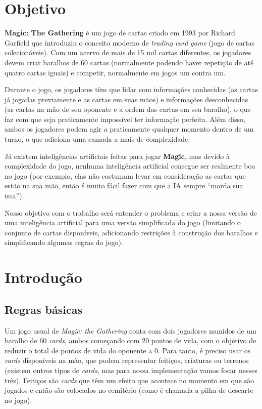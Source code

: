 \documentclass{book}
\begin{document}
\chapter*{Objetivo}
\textbf{Magic: The Gathering} é um jogo de cartas criado em 1993 por
Richard Garfield que introduziu o conceito moderno de \textit{trading
card game} (jogo de cartas colecionáveis). Com um acervo de mais de 15
mil cartas diferentes, os jogadores devem criar baralhos de 60 cartas
(normalmente podendo haver repetição de até quatro cartas iguais) e
competir, normalmente em jogos um contra um.
\par Durante o jogo, os jogadores têm que lidar com informações
conhecidas (as cartas já jogadas previamente e as cartas em suas mãos) e
informações desconhecidas (as cartas na mão de seu oponente e a ordem
das cartas em seu baralho), o que faz com que seja praticamente
impossível ter informação perfeita. Além disso, ambos os jogadores podem
agir a praticamente qualquer momento dentro de um turno, o que adiciona
uma camada a mais de complexidade.
\par Já existem inteligências artificiais feitas para jogar
\textbf{Magic}, mas devido à complexidade do jogo, nenhuma inteligência
artificial consegue ser realmente boa no jogo (por exemplo, elas não
costumam levar em consideração as cartas que estão na sua mão, então é
muito fácil fazer com que a IA sempre ``morda sua isca'').
\par Nosso objetivo com o trabalho será entender o problema e criar a
nossa versão de uma inteligência artificial para uma versão simplificada
do jogo (limitando o conjunto de cartas disponíveis, adicionando
restrições à construção dos baralhos e simplificando algumas regras do
jogo).

\chapter{Introdução}

\section{Regras básicas}

Um jogo usual de \textit{Magic: the Gathering} conta com dois jogadores
munidos de um baralho de 60 \textit{cards}, ambos começando com 20
pontos de vida, com o objetivo de reduzir o total de pontos de vida do
oponente a 0. Para tanto, é preciso usar os \textit{cards} disponíveis
na mão, que podem representar feitiços, criaturas ou terrenos (existem
outros tipos de \textit{cards}, mas para nossa implementação vamos focar
nesses três). Feitiços são \textit{cards} que têm um efeito que acontece
no momento em que são jogados e então são colocados no cemitério (como é
chamada a pilha de descarte no jogo).\\
\end{document}
